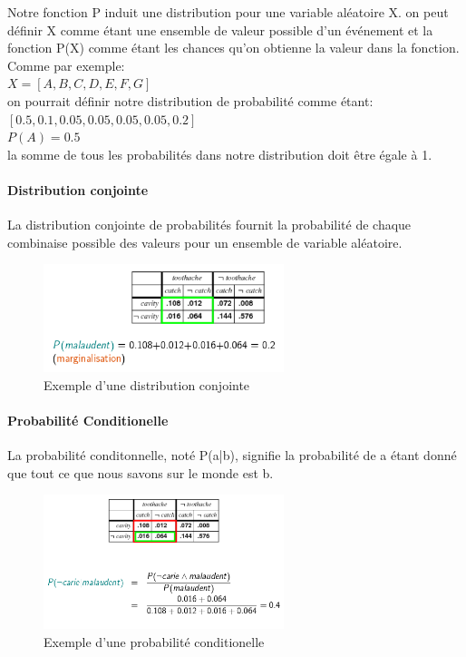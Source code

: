 \documentclass[oneside]{book}
\begin{document}
Notre fonction P induit une distribution pour une variable aléatoire X. on peut définir X comme étant une ensemble de valeur possible d'un événement et la fonction P(X) comme étant les chances qu'on obtienne la valeur dans la fonction. Comme par exemple:\\

\centering
$X = [A,B,C,D,E,F,G]$\\

on pourrait définir notre distribution de probabilité comme étant:\\

$[0.5,0.1,0.05,0.05,0.05,0.05,0.2]$\\

$P(A) = 0.5$\\

\justify
la somme de tous les probabilités dans notre distribution doit être égale à 1.\\

\paragraph{Distribution conjointe}
La distribution conjointe de probabilités fournit la probabilité de chaque combinaise possible des valeurs pour un ensemble de variable aléatoire.
\begin{figure}[!ht]
\centering
\includegraphics[width=7cm]{Distribution_Conjointe.png}
\caption{Exemple d'une distribution conjointe}
\label{fig:exemple d'une distribution conjointe}
\end{figure}

\paragraph{Probabilité Conditionelle}
La probabilité conditonnelle, noté P(a|b), signifie la probabilité de a étant donné que tout ce que nous savons sur le monde est b.

\begin{figure}[!ht]
\centering
\includegraphics[width = 7cm]{Prob_Cond.png}
\caption{Exemple d'une probabilité conditionelle}
\label{fig:prob_cond}
\end{figure}
\end{document}

